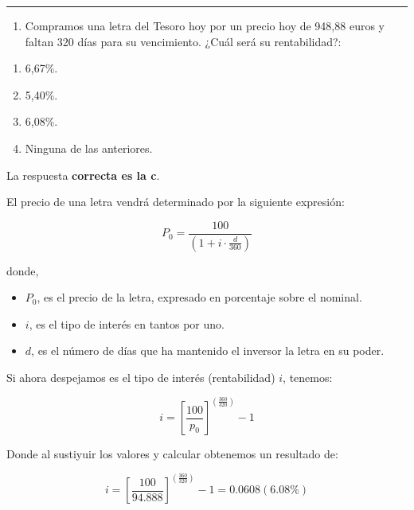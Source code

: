 \documentclass[
  letterpaper,
  DIV=11,
  numbers=noendperiod]{scrreprt}
\providecommand{\tightlist}{%
  \setlength{\itemsep}{0pt}\setlength{\parskip}{0pt}}\usepackage{longtable,booktabs,array}
\begin{document}
\begin{center}\rule{0.5\linewidth}{0.5pt}\end{center}

\begin{enumerate}
\def\labelenumi{\arabic{enumi}.}
\setcounter{enumi}{44}
\tightlist
\item
  Compramos una letra del Tesoro hoy por un precio hoy de 948,88 euros y
  faltan 320 días para su vencimiento. ¿Cuál será su rentabilidad?:
\end{enumerate}

\begin{enumerate}
\def\labelenumi{\alph{enumi})}
\item
  6,67\%.
\item
  5,40\%.
\item
  6,08\%.
\item
  Ninguna de las anteriores.
\end{enumerate}

\begin{tcolorbox}[enhanced jigsaw, left=2mm, opacityback=0, colback=white, breakable, arc=.35mm, bottomrule=.15mm, rightrule=.15mm, toprule=.15mm, leftrule=.75mm, colframe=quarto-callout-tip-color-frame]
\begin{minipage}[t]{5.5mm}
\textcolor{quarto-callout-tip-color}{\faLightbulb}
\end{minipage}%
\begin{minipage}[t]{\textwidth - 5.5mm}

La respuesta \textbf{correcta es la c}.

El precio de una letra vendrá determinado por la siguiente expresión:

\[P_0=\frac{100}{\left(1+i\cdot\frac{d}{360}\right)}\]

donde,

\begin{itemize}
\item
  \(P_0\), es el precio de la letra, expresado en porcentaje sobre el
  nominal.
\item
  \(i\), es el tipo de interés en tantos por uno.
\item
  \(d\), es el número de días que ha mantenido el inversor la letra en
  su poder.
\end{itemize}

Si ahora despejamos es el tipo de interés (rentabilidad) \(i\), tenemos:

\[i=\left[\frac{100}{p_0}\right]^{(\frac{360 }{320 })}-1\]

Donde al sustiyuir los valores y calcular obtenemos un resultado de:

\[i=\left[\frac{100}{94.888}\right]^{(\frac{360 }{320 })}-1=0.0608(6.08\%)\]

\end{minipage}%
\end{tcolorbox}
\end{document}
